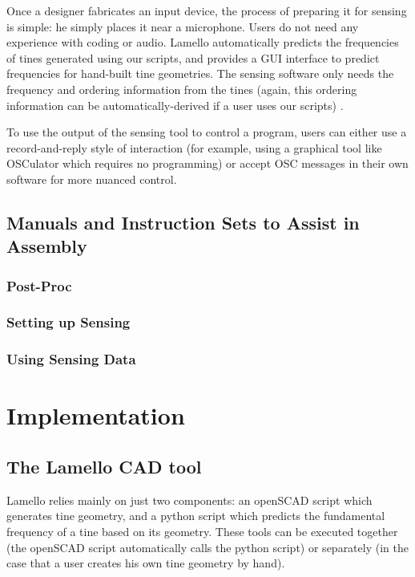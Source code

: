     Once a designer fabricates an input device, the process of preparing it for sensing is simple: he simply places it near a microphone. Users do not need any experience with coding or audio. Lamello automatically predicts the frequencies of tines generated using our scripts, and provides a GUI interface to predict frequencies for hand-built tine geometries. The sensing software only needs the frequency and ordering information from the tines (again, this ordering information can be automatically-derived if a user uses our scripts) .
    
    To use the output of the sensing tool to control a program, users can either use a record-and-reply style of interaction (for example, using a graphical tool like OSCulator which requires no programming) or accept OSC messages in their own software for more nuanced control.

    \subsection{Manuals and Instruction Sets to Assist in Assembly}

        \subsubsection{Post-Proc}

        \subsubsection{Setting up Sensing}

        \subsubsection{Using Sensing Data}

\section{Implementation}

    \subsection{The Lamello CAD tool}
    
    Lamello relies mainly on just two components: an openSCAD script which generates tine geometry, and a python script which predicts the fundamental frequency of a tine based on its geometry. These tools can be executed together (the openSCAD script automatically calls the python script) or separately (in the case that a user creates his own tine geometry by hand).
    
